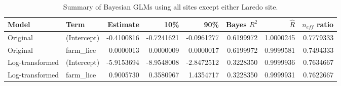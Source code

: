 \begin{table}
\centering
\caption{Summary of Bayesian GLMs using all sites except either Laredo
    site.}
\centering
\begin{tabular}[t]{llrrrrrr}
\toprule
Model & Term & Estimate & 10\% & 90\% & Bayes $R^2$ & $\hat{R}$ & $n_{eff}$ ratio\\
\midrule
Original & (Intercept) & -0.4100816 & -0.7241621 & -0.0961277 & 0.6199972 & 1.0000245 & 0.7779333\\
Original & farm_lice & 0.0000013 & 0.0000009 & 0.0000017 & 0.6199972 & 0.9999581 & 0.7494333\\
Log-transformed & (Intercept) & -5.9153694 & -8.9548008 & -2.8472512 & 0.3228350 & 0.9999936 & 0.7634667\\
Log-transformed & farm_lice & 0.9005730 & 0.3580967 & 1.4354717 & 0.3228350 & 0.9999931 & 0.7622667\\
\bottomrule
\end{tabular}
\end{table}
